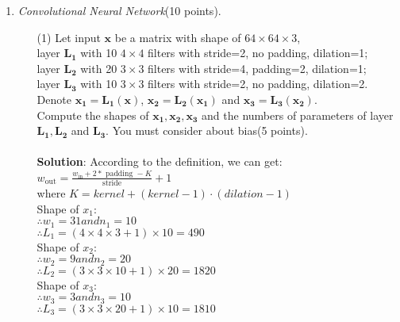 \documentclass{article}
\begin{document}
\begin{enumerate}
    \item \textit{Convolutional Neural Network}(10 points).
    
    \begin{itemize}
        \item[(1)] Let input $\bm{x}$ be a matrix with shape of $64\times64\times3$,\\ layer $\bm{L_1}$ with 10 $4\times4$ filters with stride=2, no padding, dilation=1;\\ 
        layer $\bm{L_2}$ with 20 $3\times3$ filters with stride=4, padding=2, dilation=1;\\
        layer $\bm{L_3}$ with 10 $3\times3$ filters with stride=2, no padding, dilation=2.\\
        Denote $\bm{x_1}=\bm{L_1(x)}$, $\bm{x_2}=\bm{L_2(x_1)}$ and  $\bm{x_3}=\bm{L_3(x_2)}$.\\
        Compute the shapes of $\bm{x_1,x_2,x_3}$ and the numbers of parameters of layer $\bm{L_1,L_2}$ and $\bm{L_3}$. You must consider about bias(5 points).
        \\\\
        \textbf{Solution}:
        According to the definition, we can get: $w_{\text {out}}=\frac{w_{\text {in}}+2 * \text { padding }-K}{\text { stride }}+1$\\
        where $K= kernel +( kernel -1) \cdot (dilation -1)$\\
        Shape of $x_1$: \\
        $\therefore w_1=31 and n_1=10$ \\
        $\therefore L_1=(4\times4\times3+1) \times 10=490$\\
        Shape of $x_2$: \\
        $\therefore w_2=9 and n_2=20$ \\
        $\therefore L_2=(3\times3\times10+1) \times 20=1820$\\
        Shape of $x_3$: \\
        $\therefore w_3=3 and n_3=10$ \\
        $\therefore L_3=(3\times3\times20+1) \times 10=1810$\\
                        
        
        

\end{itemize}
\end{enumerate}
\end{document}
